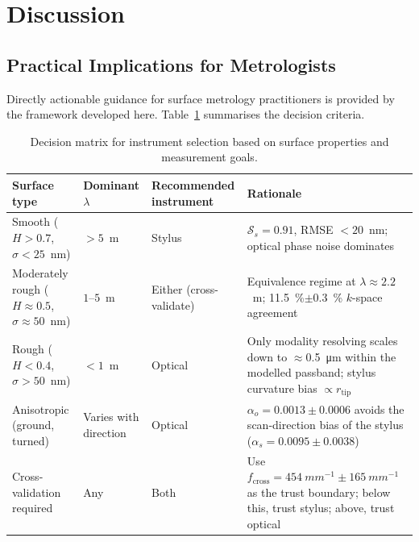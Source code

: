 \documentclass[review,12pt]{elsarticle}
\begin{document}
\section{Discussion}

\subsection{Practical Implications for Metrologists}

Directly actionable guidance for surface metrology practitioners is provided by the framework developed here. Table~\ref{tab:decision} summarises the decision criteria.

\begin{table}[htbp]
    \centering
    \caption{Decision matrix for instrument selection based on surface properties and measurement goals.\label{tab:decision}}
    \small
    \setlength{\tabcolsep}{4pt}
    \begin{tabular}{p{2.6cm}p{2.2cm}p{2.4cm}p{3.8cm}}
        \toprule
        \textbf{Surface type} & \textbf{Dominant $\lambda$} & \textbf{Recommended instrument} & \textbf{Rationale} \\
        \midrule
        Smooth ($H>0.7$, $\sigma<25$~nm) & $>5$~\textmu{}m & Stylus & $\mathcal{S}_s=0.91$, RMSE $<20$~nm; optical phase noise dominates \\
        \addlinespace
        Moderately rough ($H\approx0.5$, $\sigma\approx50$~nm) & $1$--$5$~\textmu{}m & Either (cross-validate) & Equivalence regime at $\lambda\approx2.2$~\textmu{}m; \SI{11.5}{\percent}$\pm$\SI{0.3}{\percent} $k$-space agreement \\
        \addlinespace
        Rough ($H<0.4$, $\sigma>50$~nm) & $<1$~\textmu{}m & Optical & Only modality resolving scales down to $\approx$\SI{0.5}{\micro m} within the modelled passband; stylus curvature bias $\propto r_\mathrm{tip}$ \\
        \addlinespace
        Anisotropic (ground, turned) & Varies with direction & Optical & $\alpha_o=0.0013\pm0.0006$ avoids the scan-direction bias of the stylus ($\alpha_s=0.0095\pm0.0038$) \\
        \addlinespace
        Cross-validation required & Any & Both & Use $f_\mathrm{cross}=\SI{454}{mm^{-1}}\pm\SI{165}{mm^{-1}}$ as the trust boundary; below this, trust stylus; above, trust optical \\
        \bottomrule
    \end{tabular}
\end{table}
\end{document}
